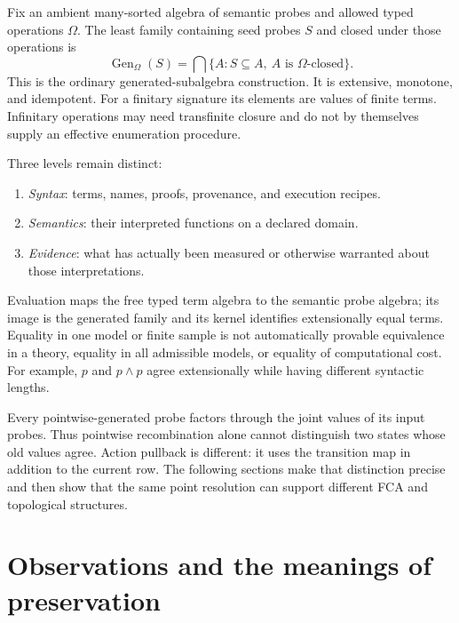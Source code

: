 \documentclass[11pt]{article}
\theoremstyle{definition}
\begin{document}
Fix an ambient many-sorted algebra of semantic probes and allowed typed
operations $\Omega$. The least family containing seed probes $S$ and closed
under those operations is
\[
 \operatorname{Gen}_{\Omega}(S)
 =\bigcap\{A:S\subseteq A,\ A\text{ is }\Omega\text{-closed}\}.
\]
This is the ordinary generated-subalgebra construction. It is extensive,
monotone, and idempotent. For a finitary signature its elements are values
of finite terms. Infinitary operations may need transfinite closure and do
not by themselves supply an effective enumeration procedure.

Three levels remain distinct:
\begin{enumerate}[label=(\roman*)]
\item \emph{Syntax}: terms, names, proofs, provenance, and execution recipes.
\item \emph{Semantics}: their interpreted functions on a declared domain.
\item \emph{Evidence}: what has actually been measured or otherwise warranted
about those interpretations.
\end{enumerate}
Evaluation maps the free typed term algebra to the semantic probe algebra;
its image is the generated family and its kernel identifies extensionally
equal terms. Equality in one model or finite sample is not automatically
provable equivalence in a theory, equality in all admissible models, or
equality of computational cost. For example, $p$ and $p\wedge p$ agree
extensionally while having different syntactic lengths.

Every pointwise-generated probe factors through the joint values of its
input probes. Thus pointwise recombination alone cannot distinguish two
states whose old values agree. Action pullback is different: it uses the
transition map in addition to the current row. The following sections make
that distinction precise and then show that the same point resolution can
support different FCA and topological structures.

\section{Observations and the meanings of preservation}
\end{document}

